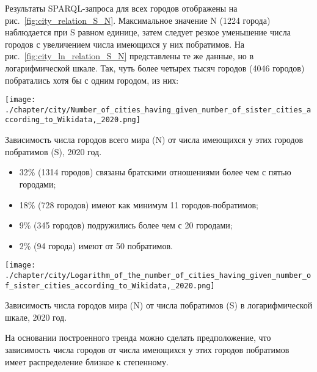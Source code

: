 Результаты SPARQL-запроса для всех городов отображены на рис.~\ref{fig:city_relation_S_N}. Максимальное значение N (\num{1224} города) наблюдается при S равном единице, затем следует резкое уменьшение числа городов с увеличением числа имеющихся у них побратимов. На рис.~\ref{fig:city_ln_relation_S_N} представлены те же данные, но в логарифмической шкале. Так, чуть более четырех тысяч городов (\num{4046} городов) побратались хотя бы с одним городом, из них:
%
\begin{marginfigure}[-10.8cm]
\texttt{[image: ./chapter/city/Number\_of\_cities\_having\_given\_number\_of\_sister\_cities\_according\_to\_Wikidata,\_2020.png]}%
\caption[Зависимость числа городов от числа имеющихся побратимов, 2020 год.]{Зависимость числа городов всего мира (N) от числа имеющихся у этих городов побратимов (S), 2020 год.}%
\label{fig:city_relation_S_N}
\end{marginfigure}

\begin{itemize}
\item 32\% (\num{1314} городов) связаны братскими отношениями более чем с пятью городами;
\item 18\% (728 городов) имеют как минимум 11 городов-побратимов;
\item 9\% (345 городов) подружились более чем с 20 городами;
\item 2\% (94 города) имеют от 50 побратимов.
\end{itemize}
%
\begin{marginfigure}[-2.4cm]
\texttt{[image: ./chapter/city/Logarithm\_of\_the\_number\_of\_cities\_having\_given\_number\_of\_sister\_cities\_according\_to\_Wikidata,\_2020.png]}%
\caption[Зависимость числа городов от числа имеющихся побратимов на логарифмической шкале, 2020 год.]{Зависимость числа городов мира (N) от числа побратимов (S) в логарифмической шкале, 2020 год.}%
\label{fig:city_ln_relation_S_N}%
\end{marginfigure}

На основании построенного тренда можно сделать предположение, 
что зависимость числа городов от числа имеющихся у этих городов побратимов 
имеет распределение близкое к степенному.

